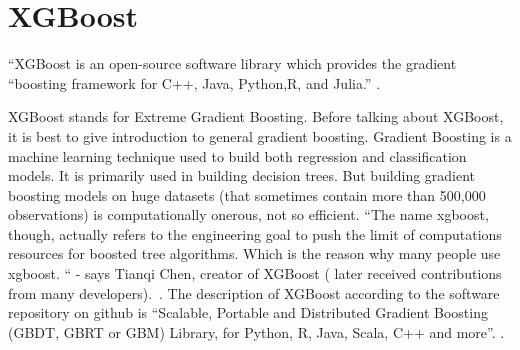 \section{XGBoost} 

“XGBoost  is an open-source software library which provides the gradient
“boosting framework for C++, Java, Python,R, and Julia.” 
\cite{hid-sp18-401-XGBoost-wiki}.

XGBoost stands for Extreme Gradient Boosting. Before talking about XGBoost, it
is best to give introduction to general gradient boosting. Gradient Boosting is
a machine learning technique used to build both regression and classification
models. It is primarily used in building decision trees. But building gradient
boosting models on huge datasets (that sometimes contain more than 500,000
observations) is computationally onerous, not so efficient.  “The name xgboost,
though, actually refers to the engineering goal to push the limit of
computations resources for boosted tree algorithms. Which is the reason why many
people use xgboost. “ - says Tianqi Chen, creator of XGBoost ( later received
contributions from many developers).~\cite{hid-sp18-401-XGBoost-gen}. The
description of XGBoost according to the software repository on github is
“Scalable, Portable and Distributed Gradient Boosting (GBDT, GBRT or GBM)
Library, for Python, R, Java, Scala, C++ and more”. 
\cite{hid-sp18-401-XGBoost-git}.
